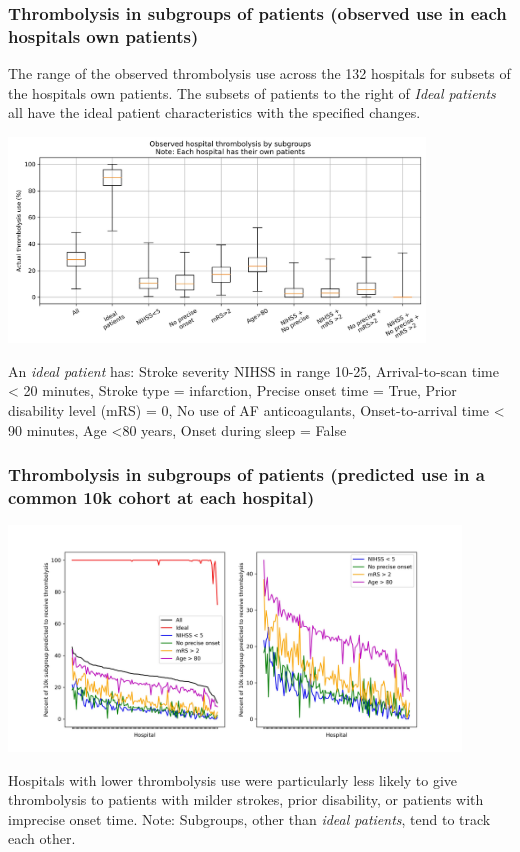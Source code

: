 \documentclass{beamer}
\begin{document}
\begin{frame}
\frametitle{Thrombolysis in subgroups of patients (observed use in each hospitals own patients)}

\footnotesize The range of the observed thrombolysis use across the 132 hospitals for subsets of the hospitals own patients. The subsets of patients to the right of \emph{Ideal patients} all have the ideal patient characteristics with the specified changes.

\begin{center}
\includegraphics[width=0.83\textwidth]{./images/15b_actual_subgroup_violin.jpg}
\end{center}


\scriptsize An \emph{ideal patient} has: Stroke severity NIHSS in range 10-25, Arrival-to-scan time \textless{} 20 minutes, Stroke type = infarction, Precise onset time = True, Prior disability level (mRS) = 0, No use of AF anticoagulants, Onset-to-arrival time \textless{} 90 minutes, Age \textless{80 years}, Onset during sleep = False
\end{frame}


\begin{frame}
\frametitle{Thrombolysis in subgroups of patients (predicted use in a common 10k cohort at each hospital)}

    \begin{center}
    \includegraphics[width=0.90\textwidth]{./images/15_10k_subgroup.jpg}
    \end{center}

\footnotesize Hospitals with lower thrombolysis use were particularly less likely to give thrombolysis to patients with milder strokes, prior disability, or patients with imprecise onset time.
\newline
\newline
\footnotesize Note: Subgroups, other than \emph{ideal patients}, tend to track each other.  

\end{frame}
\end{document}
